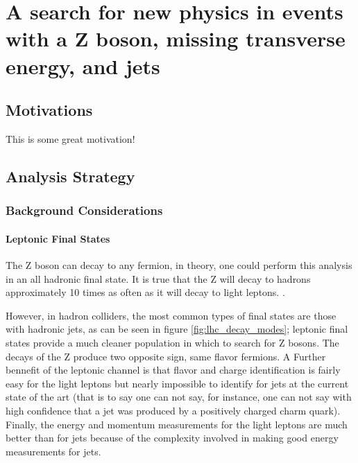 \chapter{A search for new physics in events with a Z boson, missing transverse energy, and jets}

\section{Motivations}

This is some great motivation!

\section{Analysis Strategy}

\subsection{Background Considerations}

\subsubsection{Leptonic Final States}
The Z boson can decay to any fermion, in theory, one could perform this analysis in an all hadronic final state. It is true that the Z will decay to hadrons approximately 10 times as often as it will decay to light leptons. .

However, in hadron colliders, the most common types of final states are those with hadronic jets, as can be seen in figure \ref{fig:lhc_decay_modes}; leptonic final states provide a much cleaner population in which to search for Z bosons. The decays of the Z produce two opposite sign, same flavor fermions. A Further bennefit of the leptonic channel is that flavor and charge identification is fairly easy for the light leptons but nearly impossible to identify for jets at the current state of the art (that is to say one can not say, for instance, one can not say with high confidence that a jet was produced by a positively charged charm quark). Finally, the energy and momentum measurements for the light leptons are much better than for jets because of the complexity involved in making good energy measurements for jets.  

